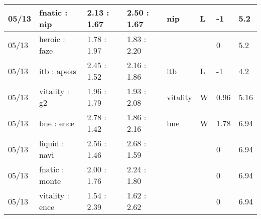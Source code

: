 \begin{small}
\begin{longtable}{|l|l|l|l|l|l|l|l|}
	05/13                               & fnatic : nip                        & 2.13 : 1.67                             & 2.50 : 1.67                             & nip                               & L                                 & -1                                   & 5.2                               \\ \hline
	05/13                               & heroic : faze                       & 1.78 : 1.97                             & 1.83 : 2.20                             &                                   &                                   & 0                                    & 5.2                               \\ \hline
	05/13                               & itb : apeks                         & 2.45 : 1.52                             & 2.16 : 1.86                             & itb                               & L                                 & -1                                   & 4.2                               \\ \hline
	05/13                               & vitality : g2                       & 1.96 : 1.79                             & 1.93 : 2.08                             & vitality                          & W                                 & 0.96                                 & 5.16                              \\ \hline
	05/13                               & bne : ence                          & 2.78 : 1.42                             & 1.86 : 2.16                             & bne                               & W                                 & 1.78                                 & 6.94                              \\ \hline
	05/13                               & liquid : navi                       & 2.56 : 1.46                             & 2.68 : 1.59                             &                                   &                                   & 0                                    & 6.94                              \\ \hline
	05/13                               & fnatic : monte                      & 2.00 : 1.76                             & 2.24 : 1.80                             &                                   &                                   & 0                                    & 6.94                              \\ \hline
	05/13                               & vitality : ence                     & 1.54 : 2.39                             & 1.62 : 2.62                             &                                   &                                   & 0                                    & 6.94                              \\ \hline

\end{longtable}
\end{small}
